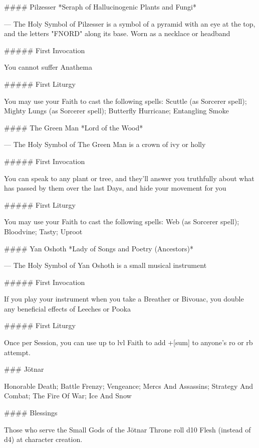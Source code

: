 #### Pilzesser
*Seraph of Hallucinogenic Plants and Fungi*

---
The Holy Symbol of Pilzesser is a symbol of a pyramid with an eye at the top, and the letters "FNORD" along its base.  Worn as a necklace or headband

##### First Invocation

You cannot suffer Anathema

##### First Liturgy

You may use your Faith to cast the following spells: Scuttle (as Sorcerer spell); Mighty Lungs (as Sorcerer spell); Butterfly Hurricane; Entangling Smoke




#### The Green Man
*Lord of the Wood*

---
The Holy Symbol of The Green Man is a crown of ivy or holly

##### First Invocation

You can speak to any plant or tree, and they'll answer you truthfully about what has passed by them over the last Days, and hide your movement for you

##### First Liturgy

You may use your Faith to cast the following spells: Web (as Sorcerer spell); Bloodvine; Tasty; Uproot




#### Yan Oshoth
*Lady of Songs and Poetry (Ancestors)*

---
The Holy Symbol of Yan Oshoth is a small musical instrument

##### First Invocation

If you play your instrument when you take a Breather or Bivouac, you double any beneficial effects of Leeches or Pooka

##### First Liturgy

Once per Session, you can use up to {lvl} Faith to add +[sum] to anyone's {ro} or {rb} attempt.





### Jötnar



Honorable Death; Battle Frenzy; Vengeance; Mercs And Assassins; Strategy And Combat; The Fire Of War; Ice And Snow



#### Blessings

Those who serve the Small Gods of the Jötnar Throne roll d10 Flesh (instead of d4) at character creation.

